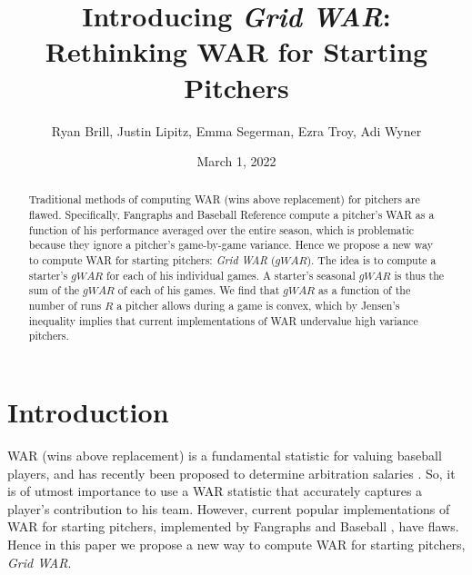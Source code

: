 \documentclass[12pt]{article}
\title{Introducing \textit{Grid WAR}: \\ Rethinking WAR for Starting Pitchers}
\author{Ryan Brill, Justin Lipitz, Emma Segerman, Ezra Troy, Adi Wyner}
\date{March 1, 2022}
\begin{document}
\maketitle

\begin{abstract}
Traditional methods of computing WAR (wins above replacement) for pitchers are flawed. Specifically, Fangraphs and Baseball Reference compute a pitcher's WAR as a function of his performance averaged over the entire season, which is problematic because they ignore a pitcher's game-by-game variance.  Hence we propose a new way to compute WAR for starting pitchers: \textit{Grid WAR} ($gWAR$). The idea is to compute a starter's $gWAR$ for each of his individual games. A starter's seasonal $gWAR$ is thus the sum of the $gWAR$ of each of his games. We find that $gWAR$ as a function of the number of runs $R$ a pitcher allows during a game is convex, which by Jensen's inequality implies that current implementations of WAR undervalue high variance pitchers.
\end{abstract}

\section{Introduction}


WAR (wins above replacement) is a fundamental statistic for valuing baseball players, and has recently been proposed to determine arbitration salaries \citep{war_arb}. So, it is of utmost importance to use a WAR statistic that accurately captures a player's contribution to his team. However, current popular implementations of WAR for starting pitchers, implemented by Fangraphs \citep{war_FG} and Baseball \citet{war_BR}, have flaws. Hence in this paper we propose a new way to compute WAR for starting pitchers, \textit{Grid WAR}. 

\end{document}
